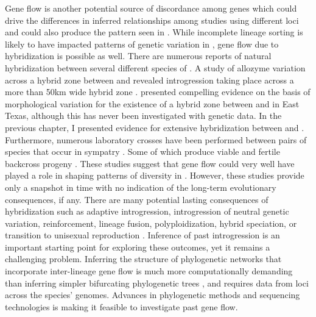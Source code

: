 



Gene flow is another potential source of discordance among genes which could  
drive the differences in inferred relationships among studies using different 
loci and could also produce the pattern seen in \fowl \parencite{degnan2009}. 
While incomplete lineage sorting is likely to have impacted patterns of genetic  
variation in \anaxyrus, gene flow due to hybridization is possible as well.
There are numerous reports of natural hybridization between several different 
species of \anaxyrus \parencite{green1996}. 
A study of allozyme variation across a hybrid zone between \amer and 
\hemiophrys revealed introgression taking place across a more than 50km wide hybrid zone \parencite{green1983}.
\textcite{meacham1962} presented compelling evidence on the basis of morphological 
variation for the existence of a hybrid zone between \fowl and \wood in East Texas,
although this has never been investigated with genetic data. 
In the previous chapter, I presented evidence for extensive hybridization between
\amer and \terr.
Furthermore, numerous laboratory crosses have been performed between pairs of \anaxyrus 
species that occur in sympatry \parencite{blair1972,blair1963}.
Some of which produce viable and fertile backcross progeny \parencite{blair1972,blair1963}.
These studies suggest that gene flow could very well have played a role in shaping patterns
of diversity in \anaxyrus. 
However, these studies provide only a snapshot in time with no indication of the long-term 
evolutionary consequences, if any.
There are many potential lasting consequences of hybridization such as adaptive introgression, 
introgression of neutral genetic variation, reinforcement, lineage fusion, 
polyploidization, hybrid speciation, or transition to unisexual reproduction \parencite{abbott2013}. 
Inference of past introgression is an important starting point for exploring these
outcomes, yet it remains a challenging problem. 
Inferring the structure of phylogenetic networks that incorporate inter-lineage
gene flow is much more computationally 
demanding than inferring simpler bifurcating phylogenetic trees \parencite{wen2018}, 
and requires data from loci across the species' genomes. Advances in phylogenetic 
methods and sequencing technologies is making it feasible to investigate past gene flow. 


